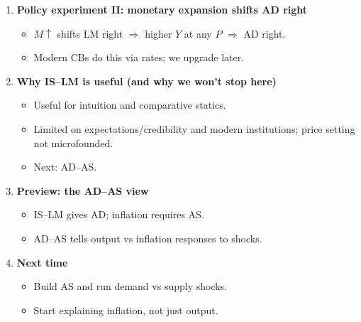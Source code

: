 \documentclass[11pt]{article}
\begin{document}
\begin{enumerate}
\item \textbf{Policy experiment II: monetary expansion shifts AD right}
\begin{itemize}
\item $M\uparrow$ shifts LM right $\Rightarrow$ higher $Y$ at any $P$ $\Rightarrow$ AD right.
\item Modern CBs do this via rates; we upgrade later.
\end{itemize}

\item \textbf{Why IS--LM is useful (and why we won’t stop here)}
\begin{itemize}
\item Useful for intuition and comparative statics.
\item Limited on expectations/credibility and modern institutions; price setting not microfounded.
\item Next: AD--AS.
\end{itemize}

\item \textbf{Preview: the AD--AS view}
\begin{itemize}
\item IS--LM gives AD; inflation requires AS.
\item AD--AS tells output vs inflation responses to shocks.
\end{itemize}

\item \textbf{Next time}
\begin{itemize}
\item Build AS and run demand vs supply shocks.
\item Start explaining inflation, not just output.
\end{itemize}
\end{enumerate}
\end{document}
